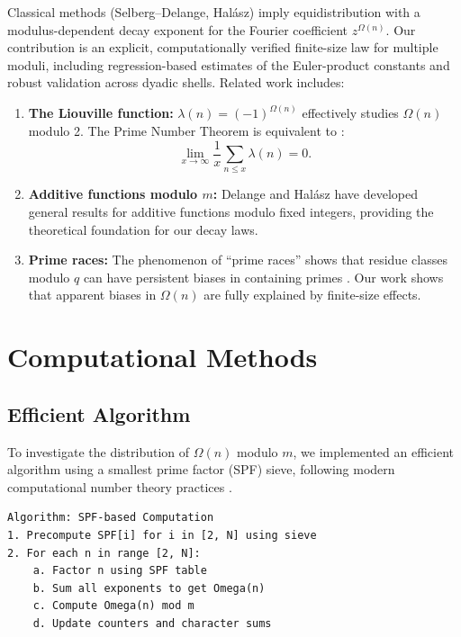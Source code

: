 \documentclass[12pt]{article}
\theoremstyle{definition}
\theoremstyle{remark}
\begin{document}
Classical methods (Selberg--Delange, Hal\'asz) imply equidistribution with a modulus-dependent decay exponent for the Fourier coefficient $z^{\Omega(n)}$. Our contribution is an explicit, computationally verified finite-size law for multiple moduli, including regression-based estimates of the Euler-product constants and robust validation across dyadic shells. Related work includes:

\begin{enumerate}
\item \textbf{The Liouville function:} $\lambda(n) = (-1)^{\Omega(n)}$ effectively studies $\Omega(n)$ modulo 2. The Prime Number Theorem is equivalent to \cite{polya1919verschiedene}:
\[
\lim_{x \to \infty} \frac{1}{x} \sum_{n \leq x} \lambda(n) = 0.
\]

\item \textbf{Additive functions modulo $m$:} Delange \cite{delange1975distribution} and Hal\'asz \cite{halasz1977distribution} have developed general results for additive functions modulo fixed integers, providing the theoretical foundation for our decay laws.

\item \textbf{Prime races:} The phenomenon of ``prime races'' shows that residue classes modulo $q$ can have persistent biases in containing primes \cite{granville2004prime}. Our work shows that apparent biases in $\Omega(n)$ are fully explained by finite-size effects.
\end{enumerate}

\section{Computational Methods}

\subsection{Efficient Algorithm}

To investigate the distribution of $\Omega(n)$ modulo $m$, we implemented an efficient algorithm using a smallest prime factor (SPF) sieve, following modern computational number theory practices \cite{bach1996algorithmic}.

\begin{verbatim}
Algorithm: SPF-based Computation
1. Precompute SPF[i] for i in [2, N] using sieve
2. For each n in range [2, N]:
    a. Factor n using SPF table
    b. Sum all exponents to get Omega(n)
    c. Compute Omega(n) mod m
    d. Update counters and character sums
\end{verbatim}
\end{document}
